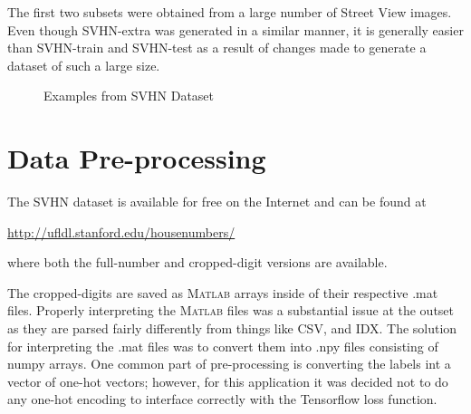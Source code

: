 \documentclass{article}
\newcommand{\MATLAB}{\textsc{Matlab}\xspace}
\begin{document}
	The first two subsets were obtained from a large number of Street View images. Even though SVHN-extra was generated in a similar manner, it is generally easier than SVHN-train and SVHN-test as a result of changes made to generate a dataset of such a large size.
	
	\begin{figure}
		\centering
		\qquad
		\caption{Examples from SVHN Dataset}%
		\label{fig:examps}%
	\end{figure}
	
	\section{Data Pre-processing}
	\label{pre-proc}
		
	The SVHN dataset is available for free on the Internet and can be found at
	\begin{center}
		\url{http://ufldl.stanford.edu/housenumbers/}
	\end{center}
	where both the full-number and cropped-digit versions are available.
	
	The cropped-digits are saved as \MATLAB arrays inside of their respective .mat files. Properly interpreting the \MATLAB files was a substantial issue at the outset as they are parsed fairly differently from things like CSV, and IDX.  The solution for interpreting the .mat files was to convert them into .npy files consisting of numpy arrays. One common part of pre-processing is converting the labels int a vector of one-hot vectors; however, for this application it was decided not to do any one-hot encoding 
	to interface correctly with the Tensorflow loss function.
\end{document}
